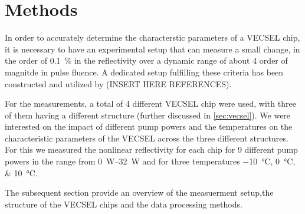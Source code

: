 \chapter{Methods}\label{chapter:methods}
In order to accurately determine the characterstic parameters of a VECSEL chip, it is necessary to have an experimental setup that can measure a small change, in the order of \qty{0.1}{\percent} in the reflectivity over a dynamic range of about 4 order of magnitde in pulse fluence. A dedicated setup fulfilling these criteria has been constructed and utilized by  (INSERT HERE REFERENCES).

For the measurements, a total of 4 different VECSEL chip were used, with three of them having a different structure (further discussed in \cref{sec:vecsel}). We were interested on the impact of different pump powers and the temperatures on the characteristic parameters of the VECSEL across the three different structures. For this we measured the nonlinear reflectivity for each chip for 9 different pump powers in the range from \qtyrange{0}{32}{\watt} and for three temperatures \qtylist{-10;0;10}{\degreeCelsius}.

The subsequent section provide an overview of the measuerment setup,the structure of the VECSEL chips and the data processing methods.







